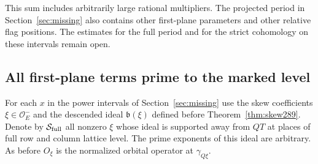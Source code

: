 \documentclass[a4paper,11pt]{article}
\theoremstyle{definition}
\theoremstyle{remark}
\numberwithin{equation}{section}
\begin{document}
This sum includes arbitrarily large rational multipliers.
The projected period in Section~\ref{sec:missing} also contains other
first-plane parameters and other relative flag positions.
The estimates for the full period and for the strict cohomology
on these intervals remain open.

\subsection{All first-plane terms prime to the marked level}\label{nav:IX-53}
For each \(x\) in the power intervals of Section~\ref{sec:missing}
use the skew coefficients \(\xi\in\mathcal O_E^-\) and
the descended ideal \(\mathfrak b(\xi)\) defined before
Theorem~\ref{thm:skew289}. Denote by \(\mathcal S_{\rm full}\)
all nonzero \(\xi\) whose ideal is supported away from \(QT\)
at places of full row and column lattice level. The prime
exponents of this ideal are arbitrary. As before \(O_\xi\)
is the normalized orbital operator at \(\gamma_{Q\xi}\).
\end{document}
